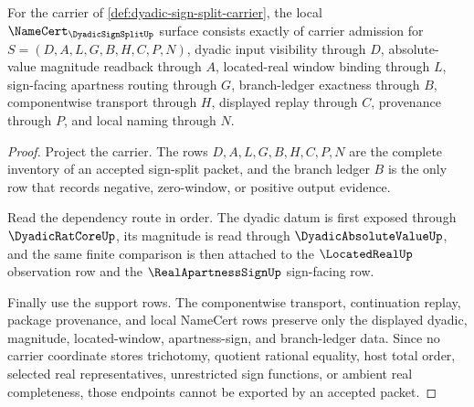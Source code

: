 \begin{theorem}
\label{thm:dyadic-sign-split-namecert-obligations}
For the carrier of \autoref{def:dyadic-sign-split-carrier}, the local $\NameCert_{\DyadicSignSplitUp}$ surface consists exactly of carrier admission for $S=(D,A,L,G,B,H,C,P,N)$, dyadic input visibility through $D$, absolute-value magnitude readback through $A$, located-real window binding through $L$, sign-facing apartness routing through $G$, branch-ledger exactness through $B$, componentwise transport through $H$, displayed replay through $C$, provenance through $P$, and local naming through $N$.
\end{theorem}
\begin{proof}
Project the carrier. The rows $D,A,L,G,B,H,C,P,N$ are the complete inventory of an accepted sign-split packet, and the branch ledger $B$ is the only row that records negative, zero-window, or positive output evidence.

Read the dependency route in order. The dyadic datum is first exposed through $\DyadicRatCoreUp$, its magnitude is read through $\DyadicAbsoluteValueUp$, and the same finite comparison is then attached to the $\LocatedRealUp$ observation row and the $\RealApartnessSignUp$ sign-facing row.

Finally use the support rows. The componentwise transport, continuation replay, package provenance, and local NameCert rows preserve only the displayed dyadic, magnitude, located-window, apartness-sign, and branch-ledger data. Since no carrier coordinate stores trichotomy, quotient rational equality, host total order, selected real representatives, unrestricted sign functions, or ambient real completeness, those endpoints cannot be exported by an accepted packet.
\end{proof}

\begin{closurestatus}{\DyadicSignSplitUp}
  \theoryclosure{\obligationClosure}
  \formalstatus{\unformalizedV}
\end{closurestatus}
